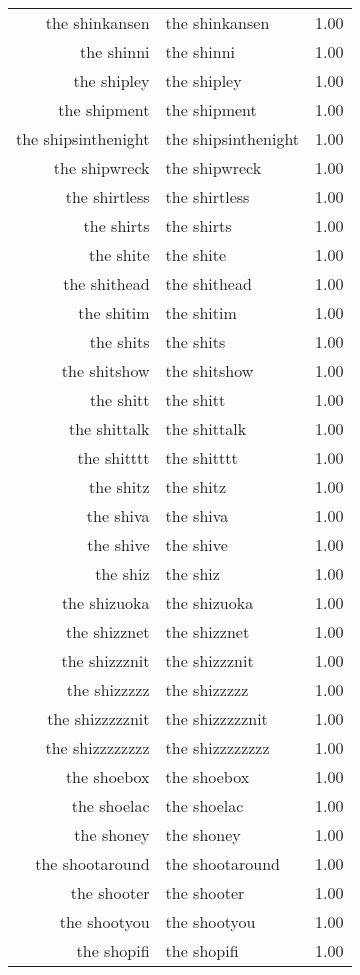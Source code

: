 \begin{table}[ht]
\begin{tabular}{rlr}
  the shinkansen & the shinkansen & 1.00 \\ 
  the shinni & the shinni & 1.00 \\ 
  the shipley & the shipley & 1.00 \\ 
  the shipment & the shipment & 1.00 \\ 
  the shipsinthenight & the shipsinthenight & 1.00 \\ 
  the shipwreck & the shipwreck & 1.00 \\ 
  the shirtless & the shirtless & 1.00 \\ 
  the shirts & the shirts & 1.00 \\ 
  the shite & the shite & 1.00 \\ 
  the shithead & the shithead & 1.00 \\ 
  the shitim & the shitim & 1.00 \\ 
  the shits & the shits & 1.00 \\ 
  the shitshow & the shitshow & 1.00 \\ 
  the shitt & the shitt & 1.00 \\ 
  the shittalk & the shittalk & 1.00 \\ 
  the shitttt & the shitttt & 1.00 \\ 
  the shitz & the shitz & 1.00 \\ 
  the shiva & the shiva & 1.00 \\ 
  the shive & the shive & 1.00 \\ 
  the shiz & the shiz & 1.00 \\ 
  the shizuoka & the shizuoka & 1.00 \\ 
  the shizznet & the shizznet & 1.00 \\ 
  the shizzznit & the shizzznit & 1.00 \\ 
  the shizzzzz & the shizzzzz & 1.00 \\ 
  the shizzzzznit & the shizzzzznit & 1.00 \\ 
  the shizzzzzzzz & the shizzzzzzzz & 1.00 \\ 
  the shoebox & the shoebox & 1.00 \\ 
  the shoelac & the shoelac & 1.00 \\ 
  the shoney & the shoney & 1.00 \\ 
  the shootaround & the shootaround & 1.00 \\ 
  the shooter & the shooter & 1.00 \\ 
  the shootyou & the shootyou & 1.00 \\ 
  the shopifi & the shopifi & 1.00 \\ 

\end{tabular}
\end{table}
